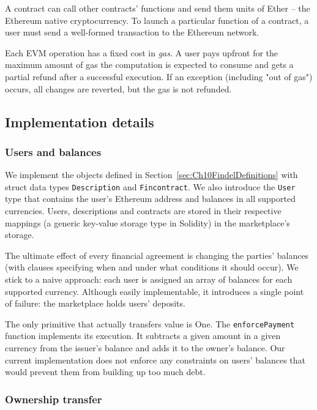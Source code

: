 A contract can call other contracts' functions and send them units of Ether -- the Ethereum native cryptocurrency.
To launch a particular function of a contract, a user must send a well-formed transaction to the Ethereum network.

Each EVM operation has a fixed cost in \textit{gas}.
A user pays upfront for the maximum amount of gas the computation is expected to consume and gets a partial refund after a successful execution.
If an exception (including "out of gas") occurs, all changes are reverted, but the gas is not refunded.


\subsection{Implementation details}

\subsubsection{Users and balances}

We implement the objects defined in Section~\ref{sec:Ch10FindelDefinitions} with struct data types \texttt{Description} and \texttt{Fincontract}.
We also introduce the \texttt{User} type that contains the user's Ethereum address and balances in all supported currencies.
Users, descriptions and contracts are stored in their respective mappings (a generic key-value storage type in Solidity) in the marketplace's storage.

The ultimate effect of every financial agreement is changing the parties' balances (with clauses specifying when and under what conditions it should occur).
We stick to a naive approach: each user is assigned an array of balances for each supported currency.
Although easily implementable, it introduces a single point of failure: the marketplace holds users' deposits.

The only primitive that actually transfers value is \(\mathrm{One}\).
The \texttt{enforcePayment} function implements its execution.
It subtracts a given amount in a given currency from the issuer's balance and adds it to the owner's balance.
Our current implementation does not enforce any constraints on users' balances that would prevent them from building up too much debt.


\subsubsection{Ownership transfer}

